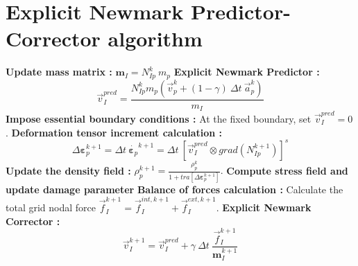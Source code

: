 \message{ !name(2020_EFM_MPM_Eigensoftening.tex)}\documentclass[preprint,12pt,a4paper]{elsarticle}
\newcommand{\tens}[1]{
  \ensuremath{\mathbf{{#1}}}
}
\newcommand\Grad[1]{grad({#1})}
\begin{document}
\section{Explicit Newmark Predictor-Corrector algorithm}
\label{sec:expl-pred-corr}
\begin{algorithm}[H]
  \DontPrintSemicolon
    \textbf{Update mass matrix :} $ \tens{m}_{I} = N_{Ip}^{k}\ m_p$ \;
    \textbf{Explicit Newmark Predictor :}
    \begin{equation*}
      \vec{v}_I^{pred} = \frac{ N_{Ip}^{k} m_p (\vec{v}_p^k + (1 - \gamma)\ \Delta t\ \vec{a}_p^k)}{m_I}
    \end{equation*}\;
    \textbf{Impose essential boundary conditions :} At the fixed
    boundary, set $\vec{v}_{I}^{pred} = 0$.\; 
    \textbf{Deformation tensor increment calculation :}
    \begin{equation*}
      \Delta \tens{\varepsilon}_{p}^{k+1} = \Delta t\
        \dot{\tens{\varepsilon}_{p}}^{k+1} = \Delta t\ \left[ \vec{v}_{I}^{pred} \otimes
        \Grad{N_{Ip}^{k+1}} \right]^s
    \end{equation*} \;
    \textbf{Update the density field :} $\rho_p^{k+1} =
    \frac{\rho_p^k}{1 + \mathit{tra}\left[\Delta\tens{\varepsilon}_{p}^{k+1}\right]}.$\;
    \textbf{Compute stress field and update damage parameter}\;
    \textbf{Balance of forces calculation :} Calculate the total grid
    nodal force $\vec{f}_{I}^{k+1} = \vec{f}_{I}^{int,k+1} + \vec{f}_{I}^{ext,k+1}$.\;
    \textbf{Explicit Newmark Corrector :}
    \begin{equation*}
      \vec{v}_{I}^{k+1} = \vec{v}_{I}^{pred} + \gamma\ \Delta t\ \frac{\vec{f}_{I}^{k+1}}{\tens{m}_I^{k+1}}  
    \end{equation*}\;

\end{algorithm}
\end{document}

